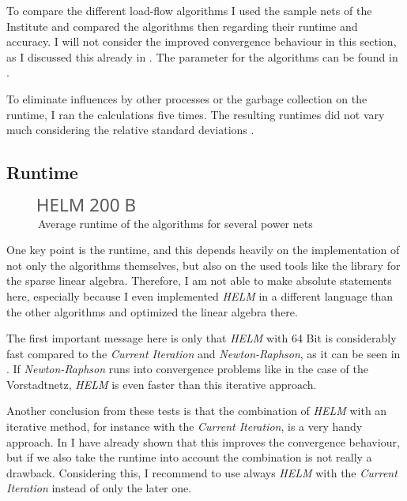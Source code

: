 To compare the different load-flow algorithms I used the sample nets of the Institute and compared the algorithms then regarding their runtime and accuracy. I will not consider the improved convergence behaviour in this section, as I discussed this already in . The parameter for the algorithms can be found in .

To eliminate influences by other processes or the garbage collection on the runtime, I ran the calculations five times. The resulting runtimes did not vary much considering the relative standard deviations .

\subsection{Runtime}

\begin{figure}
	\centering
	\includegraphics[scale=0.7]{figures/comparison_runtime}
	\caption[Comparison, average runtime]{Average runtime of the algorithms for several power nets}
	\label{fig:comparison_runtime}
\end{figure}

One key point is the runtime, and this depends heavily on the implementation of not only the algorithms themselves, but also on the used tools like the library for the sparse linear algebra. Therefore, I am not able to make absolute statements here, especially because I even implemented \emph{HELM} in a different language than the other algorithms and optimized the linear algebra there.

The first important message here is only that \emph{HELM} with 64 Bit is considerably fast compared to the \emph{Current Iteration} and \emph{Newton-Raphson}, as it can be seen in . If \emph{Newton-Raphson} runs into convergence problems like in the case of the Vorstadtnetz, \emph{HELM} is even faster than this iterative approach. 

Another conclusion from these tests is that the combination of \emph{HELM} with an iterative method, for instance with the \emph{Current Iteration}, is a very handy approach. In  I have already shown that this improves the convergence behaviour, but if we also take the runtime into account the combination is not really a drawback. Considering this, I recommend to use always \emph{HELM} with the \emph{Current Iteration} instead of only the later one.

